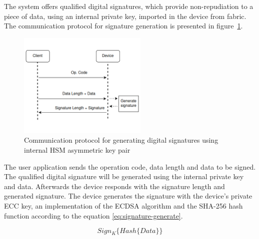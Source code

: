The system offers qualified digital signatures, which provide non-repudiation to a piece of data, using an internal private key, imported in the device from fabric.
The communication protocol for signature generation is presented in figure~\ref{fig:protocol:signature-generate}.
\begin{figure}[h!]
	\centering
	\includegraphics[width=0.55\textwidth]{./Images/signature-generate.png}
	\caption{Communication protocol for generating digital signatures using internal HSM asymmetric key pair}
	\label{fig:protocol:signature-generate}
\end{figure}
The user application sends the operation code, data length and data to be signed.
The qualified digital signature will be generated using the internal private key and data. Afterwards the device responds with the signature length and generated signature.
The device generates the signature with the device's private ECC key, an implementation of the \ac{ECDSA} algorithm and the SHA-256 hash function according to the equation \ref{eq:signature-generate}.

\begin{equation}
	\label{eq:signature-generate}
	Sign_{K}\{Hash\{Data\}\}
\end{equation}

